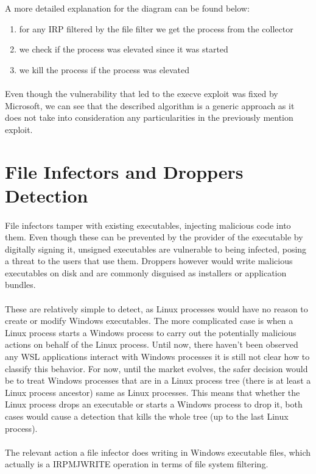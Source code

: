         
        A more detailed explanation for the diagram can be found below:

        \begin{enumerate}
            \item for any IRP filtered by the file filter we get the process from the collector
            \item we check if the process was elevated since it was started
            \item we kill the process if the process was elevated
        \end{enumerate}

        \paragraph{}
        Even though the vulnerability that led to the execve exploit\cite{execve} was fixed by Microsoft, we can see that the described algorithm
        is a generic approach as it does not take into consideration any particularities in the previously mention exploit.

    \section{File Infectors and Droppers Detection}
        \paragraph{}
        File infectors tamper with existing executables, injecting malicious code into them. Even though these can be prevented by the provider
        of the executable by digitally signing it, unsigned executables are vulnerable to being infected, posing a threat to the users that
        use them. Droppers however would write malicious executables on disk and are commonly disguised as installers or application bundles.

        \paragraph{}
        These are relatively simple to detect, as Linux processes would have no reason to create or modify Windows executables. The more
        complicated case is when a Linux process starts a Windows process to carry out the potentially malicious actions on behalf of the Linux
        process. Until now, there haven't been observed any WSL applications interact with Windows processes it is still not clear how to
        classify this behavior. For now, until the market evolves, the safer decision would be to treat Windows processes that are in a
        Linux process tree (there is at least a Linux process ancestor) same as Linux processes. This means that whether the Linux process
        drops an executable or starts a Windows process to drop it, both cases would cause a detection that kills the whole tree (up to the
        last Linux process).

        \paragraph{}
        The relevant action a file infector does writing in Windows executable files, which actually is a
        IRP\textunderscore MJ\textunderscore WRITE operation in terms of file system filtering.
